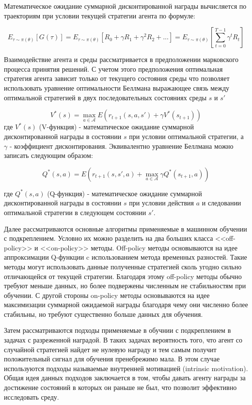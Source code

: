 Математическое ожидание суммарной дисконтированной награды вычисляется по траекториям при условии текущей стратегии агента по формуле: 

\[
E_{\tau \sim \pi(\theta)} [G(\tau)] = E_{\tau \sim \pi(\theta)} [R_0 + \gamma R_{1} + \gamma ^ 2 R_{2} + ...] = E_{\tau \sim \pi(\theta)} [\sum_{t=0}^{T - 1} \gamma ^t R_{t}]
\]

Взаимодействие агента и среды рассматривается в предположении марковского процесса принятия решений. С учетом этого предположения оптимальная стратегия агента зависит только от текущего состояния среды что позволяет использовать уравнение оптимальности Беллмана выражающее связь между оптимальной стратегией в двух последовательных состояниях среды $s$ и $s'$

\[
	V^*(s) = \max_{a \in \mathcal{A}} E(r_{t + 1}(s, a, s') + \gamma V^*(s_{t + 1}))
\]
где $V^*(s)$ (V-функция) - математическое ожидание суммарной дисконтированной награды в состоянии $s$ при условии оптимальной стратегии, а $\gamma$ - коэффициент дисконтирования. Эквивалентно уравнение Беллмана можно записать следующим образом: 

\[
	Q^*(s, a) = E(r_{t + 1}(s, s', a) + \max_{a \in \mathcal{A}} \gamma Q^*(s_{t + 1}, a))
\]

где $Q^*(s, a)$ (Q-функция) - математическое ожидание суммарной дисконтированной награды в состоянии $s$ при условии действия $a$ и следовании оптимальной стратегии в следующем состоянии $s'$.

Далее рассматриваются основные алгоритмы применяемые в машинном обучении с подкреплением. Условно их можно разделить на два больших класса <<off-policy>> и <<on-policy>> методы. Off-policy методы основываются на идее аппроксимации Q-функции c использованием метода временных разностей. Такие методы могут использовать данные полученные стратегией сколь угодно сильно отличающейся от текущей стратегии. Благодаря этому off-policy методы обычно требуют меньше данных, но более подвержены численным не стабильностям при обучении. С другой стороны on-policy методы основываются на идее максимизации суммарной ожидаемой награды благодаря чему они численно более стабильны, но требуют существенно больше данных для обучения. 

Затем рассматриваются подходы применяемые в обучнии с подкреплением в задачах с разреженной наградой. В таких задачах вероятность того, что агент со случайной стратегией найдет не нулевую награду и тем самым получит положительный сигнал для обучения пренебрежимо мала. В этом случае используются подходы называемые внутренней мотивацией (intrinsic motivation). Общая идея данных подходов заключается в том, чтобы давать агенту награды за достижение состояний в которых он раньше не был, что позволит эффективно исследовать среду. 

